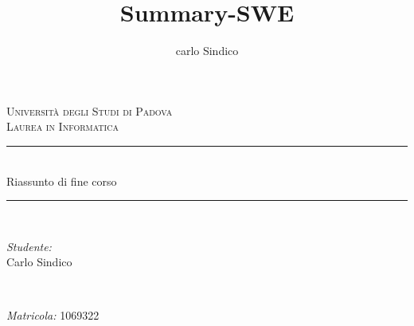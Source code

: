 \documentclass[10pt]{article}
\title{Summary-SWE}
\author{carlo Sindico}
\begin{document}



\begin{titlepage}

\newcommand{\HRule}{\rule{\linewidth}{0.5mm}} %


\center %
 

\textsc{\LARGE Universit\`a degli Studi di Padova}\\[1.5cm] %

\textsc{\Large Laurea in Informatica}\\[0.5cm] %



\HRule \\[0.4cm]
{ \huge  Riassunto di fine corso}\\[0.3cm] %
\HRule \\[1.5cm]
 

\begin{minipage}{0.4\textwidth}
\begin{flushleft} \large
\emph{Studente:}\\
Carlo Sindico%
\end{flushleft}
\end{minipage}
~
\begin{minipage}{0.4\textwidth}
\begin{flushright} \large
\emph{Matricola:}
\textsc{1069322} %
\end{flushright}
\end{minipage}\\[4cm]



\end{titlepage}
\end{document}
